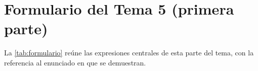 \clearpage
\appendix
\renewcommand{\thesection}{\Alph{section}}
\section{Formulario del Tema 5 (primera parte)}\label{sec:formulario}

La \cref{tab:formulario} reúne las expresiones centrales de esta parte del tema, con la referencia al enunciado en que se demuestran.

\begingroup
\centering
{}
\label{tab:formulario}
\small
\renewcommand{\arraystretch}{1.75}
